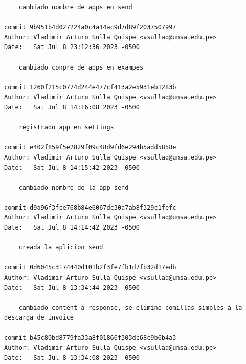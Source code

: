 \documentclass{article}
\begin{document}
\begin{lstlisting}
    cambiado nombre de apps en send

commit 9b951b4d027224a0c4a14ac9d7d89f2037507997
Author: Vladimir Arturo Sulla Quispe <vsullaq@unsa.edu.pe>
Date:   Sat Jul 8 23:12:36 2023 -0500

    cambiado conpre de apps en exampes

commit 1260f215c0774d244e477cf413a2e5931eb1283b
Author: Vladimir Arturo Sulla Quispe <vsullaq@unsa.edu.pe>
Date:   Sat Jul 8 14:16:08 2023 -0500

    registrado app en settings

commit e402f859f5e2829f09c48d9fd6e294b5add5858e
Author: Vladimir Arturo Sulla Quispe <vsullaq@unsa.edu.pe>
Date:   Sat Jul 8 14:15:42 2023 -0500

    cambiado nombre de la app send

commit d9a96f3fce768b84e6067dc30a7ab8f329c1fefc
Author: Vladimir Arturo Sulla Quispe <vsullaq@unsa.edu.pe>
Date:   Sat Jul 8 14:14:42 2023 -0500

    creada la aplicion send

commit 0d6045c3174440d101b2f3fe7fb1d7fb32d17edb
Author: Vladimir Arturo Sulla Quispe <vsullaq@unsa.edu.pe>
Date:   Sat Jul 8 13:34:44 2023 -0500

    cambiado content a response, se elimino comillas simples a la descarga de invoice

commit b45c80bd8779fa33a8f01866f303dc68c9b6b4a3
Author: Vladimir Arturo Sulla Quispe <vsullaq@unsa.edu.pe>
Date:   Sat Jul 8 13:34:08 2023 -0500

\end{lstlisting}

\printbibliography[
heading=bibintoc,
title={References}
]
\end{document}
